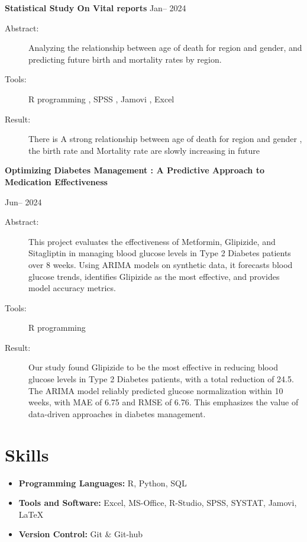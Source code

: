\documentclass[a4paper,11pt]{article}
\begin{document}
	\noindent
	{\textbf{Statistical Study On Vital reports} \hfill Jan-- 2024 \\}
	\begin{description}
		\item[Abstract:] Analyzing the relationship between age of death for region and gender, and predicting future birth and mortality rates by region.
		\item[Tools:] R programming , SPSS , Jamovi , Excel
		\item[Result:] There is A strong relationship between age of death for region and gender , the birth rate and Mortality rate are slowly increasing in future\\
		\linebreak[2mm]
	\end{description}
	\textbf{Optimizing Diabetes Management : A Predictive Approach to Medication Effectiveness}
	\begin{flushright}
		\hfill Jun-- 2024 \\
	\end{flushright}
	\begin{description}
		\item[Abstract:] This project evaluates the effectiveness of Metformin, Glipizide, and Sitagliptin in managing blood glucose levels in Type 2 Diabetes patients over 8 weeks. Using ARIMA models on synthetic data, it forecasts blood glucose trends, identifies Glipizide as the most effective, and provides model accuracy metrics.
		\item[Tools:] R programming 
		\item[Result:] Our study found Glipizide to be the most effective in reducing blood glucose levels in Type 2 Diabetes patients, with a total reduction of 24.5. The ARIMA model reliably predicted glucose normalization within 10 weeks, with MAE of 6.75 and RMSE of 6.76. This emphasizes the value of data-driven approaches in diabetes management.
		
		
	\end{description}
	
	
	\section*{Skills}
	\begin{itemize}
		\item \textbf{Programming Languages:}  R, Python, SQL
		\item \textbf{Tools and Software:} Excel, MS-Office,
		R-Studio, SPSS, SYSTAT, Jamovi, \LaTeX
		\item \textbf{Version Control:} Git \& Git-hub
		
	\end{itemize}
	
\end{document}
